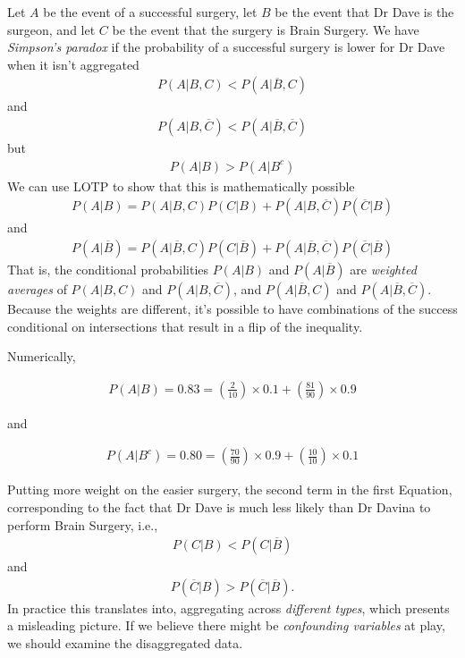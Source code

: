 \documentclass[11pt,a4paper]{article}
\begin{document}
Let \(A\) be the event of a successful surgery, 
let \(B\) be the event that Dr Dave is the surgeon, 
and let \(C\) be the event that the surgery is Brain Surgery. 
We have \emph{Simpson's paradox} if the probability of a successful surgery is 
lower for Dr Dave when it isn't aggregated
\begin{align}
P\left(A | B, C\right) < P(A|\overline{B},C)
\end{align}
and
\begin{align}
P\left(A | B, \overline{C}\right) < P(A|\overline{B},\overline{C})
\end{align}
but
\begin{align}
P\left(A | B \right) > P(A|B^{c})
\end{align}
We can use LOTP to show that this is mathematically possible
\begin{align}
P\left(A|B\right) = 
P\left(A|B,C\right)P\left(C|B\right) + P\left(A|B,\overline{C}\right)P(\overline{C}|B)
\end{align}
and
\begin{align}
P\left(A|\overline{B} \right) = 
P\left(A|\overline{B},C \right)P\left(C| \overline{B}\right) 
+ P\left(A|\overline{B},\overline{C}\right)P(\overline{C}|\overline{B})
\end{align}
That is, 
the conditional probabilities \(P(A|B)\) and \(P(A|\overline{B})\) 
are \emph{weighted averages} of \(P\left(A|B,C \right)\) and \(P(A|B,\overline{C})\), 
and \(P\left(A|\overline{B},C \right)\) and \(P(A|\overline{B},\overline{C})\). 
Because the weights are different, 
it's possible to have combinations of the success conditional on intersections that result in a flip of the inequality.

Numerically,

\begin{align}
P\left(A|B\right) = 0.83 = \left( \frac{2}{10} \right) \times 0.1 + \left(\frac{81}{90} \right) \times 0.9
\end{align}

and

\begin{align}
P\left(A|B^{c} \right) = 0.80 = \left(\frac{70}{90} \right) \times 0.9 + \left( \frac{10}{10} \right) \times 0.1
\end{align}

Putting more weight on the easier surgery, 
the second term in the first Equation, 
corresponding to the fact that Dr Dave is much less likely than Dr Davina to perform Brain Surgery, i.e.,
\begin{align}
P\left(C|B\right) < P(C|\overline{B})
\end{align}
and
\begin{align}
P\left(\overline{C}|B\right) > P\left(\overline{C}|\overline{B} \right).
\end{align}
In practice this translates into, 
aggregating across \emph{different types},
which presents a misleading picture. 
If we believe there might be \emph{confounding variables} at play, 
we should examine the disaggregated data.
\end{document}
